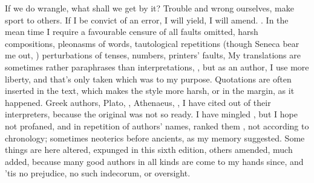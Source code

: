 If we do wrangle, what shall we get by it? Trouble and wrong ourselves, make
sport to others. If I be convict of an error, I will yield, I will amend.
. In the mean time I require a
favourable censure of all faults omitted, harsh compositions, pleonasms of
words, tautological repetitions (though Seneca bear me out, ) perturbations of tenses, numbers,
printers' faults, \etc{} My translations are sometimes rather paraphrases than
interpretations, , but as an author, I use more liberty, and
that's only taken which was to my purpose. Quotations are often inserted in the
text, which makes the style more harsh, or in the margin, as it happened. Greek
authors, Plato, , Athenaeus, \etc{}, I have cited out of
their interpreters, because the original was not so ready. I have mingled
, but I hope not profaned, and in repetition of authors'
names, ranked them , not according to chronology; sometimes
neoterics before ancients, as my memory suggested. Some things are here
altered, expunged in this sixth edition, others amended, much added, because
many good authors in all kinds are come to my hands since,
and 'tis no prejudice, no such indecorum, or oversight.


